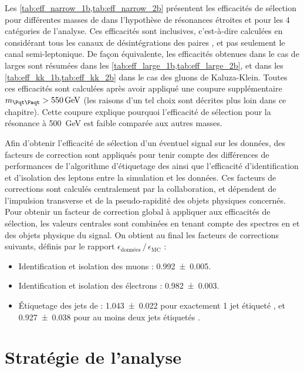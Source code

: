 Les \cref{tab:eff_narrow_1b,tab:eff_narrow_2b} présentent les efficacités de sélection pour différentes masses de \zprime dans l'hypothèse de résonances étroites et pour les 4 catégories de l'analyse. Ces efficacités sont inclusives, c'est-à-dire calculées en considérant tous les canaux de désintégrations des paires \ttbar, et pas seulement le canal semi-leptonique. De façon équivalente, les efficacités obtenues dans le cas de \zprime larges sont résumées dans les \cref{tab:eff_large_1b,tab:eff_large_2b}, et dans les \cref{tab:eff_kk_1b,tab:eff_kk_2b} dans le cas des gluons de Kaluza-Klein. Toutes ces efficacités sont calculées après avoir appliqué une coupure supplémentaire $\mtt > \SI{550}{\GeV}$ (les raisons d'un tel choix sont décrites plus loin dans ce chapitre). Cette coupure explique pourquoi l'efficacité de sélection pour la résonance à \SI{500}{\GeV} est faible comparée aux autres masses.

\bigskip

Afin d'obtenir l'efficacité de sélection d'un éventuel signal sur les données, des facteurs de correction sont appliqués pour tenir compte des différences de performances de l'algorithme d'étiquetage des \Pbottom ainsi que l'efficacité d'identification et d'isolation des leptons entre la simulation et les données. Ces facteurs de corrections sont calculés centralement par la collaboration, et dépendent de l'impulsion transverse et de la pseudo-rapidité des objets physiques concernés. Pour obtenir un facteur de correction global à appliquer aux efficacités de sélection, les valeurs centrales sont combinées en tenant compte des spectres en \pt et \aeta des objets physique du signal. On obtient au final les facteurs de corrections suivants, définis par le rapport $\epsilon_{\text{données}} \, / \, \epsilon_{\text{MC}}$ :
\begin{itemize}
  \item Identification et isolation des muons : \num{0.992 \pm 0.005}.
  \item Identification et isolation des électrons : \num{0.982 \pm 0.003}.
  \item Étiquetage des jets de \Pbottom : \num{1.043 \pm 0.022} pour exactement 1 jet étiqueté \Pbottom, et \num{0.927 \pm 0.038} pour au moins deux jets étiquetés \Pbottom.
\end{itemize}

\section{Stratégie de l'analyse}

